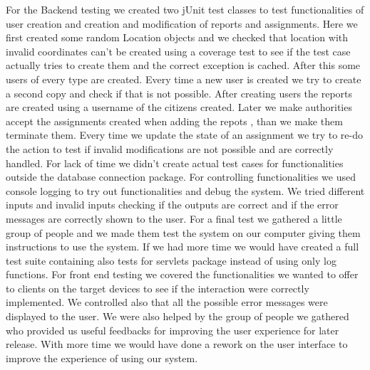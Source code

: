 
For the Backend testing we created two jUnit test classes to test functionalities of user creation and creation and modification of reports and assignments. Here we first created some random Location objects and we checked that location with invalid coordinates can't be created using a coverage test to see if the test case actually tries to create them and the correct exception is cached. After this some users of every type are created. Every time a new user is created we try to create a second copy and check if that is not possible.
After creating users the reports are created using a username of the citizens created.
Later we make authorities accept the assignments created when adding the repots , than we make them terminate them.
Every time we update the state of an assignment we try to re-do the action to test if invalid modifications are not possible and are correctly handled.
For lack of time we didn't create actual test cases for functionalities outside the database connection package. 
For controlling functionalities we used console logging to try out functionalities and debug the system.
We tried different inputs and invalid inputs checking if the outputs are correct and if the error messages are correctly shown to the user.
For a final test we gathered a little group of people and we made them test the system on our computer giving them instructions to use the system.
If we had more time we would have created a full test suite containing also tests for servlets package instead of using only log functions. 
For front end testing we covered the functionalities we wanted to offer to clients on the target devices to see if the interaction were correctly implemented. We controlled also that all the possible error messages were displayed to the user.
We were also helped by the group of people we gathered who provided us useful feedbacks for improving the user experience for later release. With more time we would have done a rework on the user interface to improve the experience of using our system.

